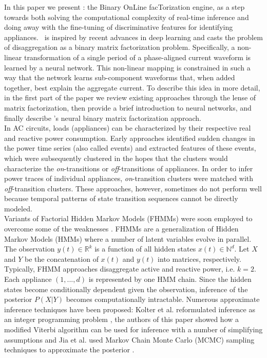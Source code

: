 In this paper we present \ourname: the Binary OnLine facTorization engine, as a step towards both solving the computational complexity of real-time inference and doing away with the fine-tuning of discriminative features for identifying appliances. \ourname~is inspired by recent advances in deep learning and casts the problem of disaggregation as a binary matrix factorization problem. Specifically, a non-linear transformation of a single period of a phase-aligned current waveform is learned by a neural network. This non-linear mapping is constrained in such a way that the network learns sub-component waveforms that, when added together, best explain the aggregate current. To describe this idea in more detail, in the first part of the paper we review existing approaches through the lense of matrix factorization, then provide a brief introduction to neural networks, and finally describe \ourname's neural binary matrix factorization approach. 
 \\
In AC circuits, loads (appliances) can be characterized by their respective real and reactive power consumption. Early approaches identified sudden changes in the power time series (also called events) and extracted features of these events, which were subsequently clustered in the hopes that the clusters would characterize the \emph{on}-transitions or \emph{off}-transitions of appliances. In order to infer power traces of individual appliances, \emph{on}-transition clusters were matched with \emph{off}-transition clusters. These approaches, however, sometimes do not perform well because temporal patterns of state transition sequences cannot be directly modeled.\\ Variants of Factorial Hidden Markov Models (FHMMs) were soon employed to overcome some of the weaknesses  \cite{jiafully,johnson2013bayesian,kolter2012fhmm,lange2016disaggregation}. FHMMs \cite{ghahramani1997factorial} are a generalization of Hidden Markov Models (HMMs) where a number of latent variables evolve in parallel. The observation $y(t) \in \mathbb{R}^{k}$ is a function of all hidden states $x(t) \in \mathbb{N}^d$. Let $X$ and $Y$ be the concatenation of $x(t)$ and $y(t)$ into matrices, respectively. Typically, FHMM approaches disaggregate active and reactive power, i.e. $k=2$. Each appliance $(1, ..., d)$ is represented by one HMM chain. Since the hidden states become conditionally dependent given the observation, inference of the posterior $P(X|Y)$ becomes computationally intractable. Numerous approximate inference techniques have been proposed: Kolter et al. reformulated inference as an integer programming problem \cite{kolter2012fhmm}, the authors of this paper showed how a modified Viterbi algorithm can be used for inference with a number of simplifying assumptions \cite{lange2016efficient} and Jia et al. used Markov Chain Monte Carlo (MCMC) sampling techniques to approximate the posterior \cite{jiafully}.

